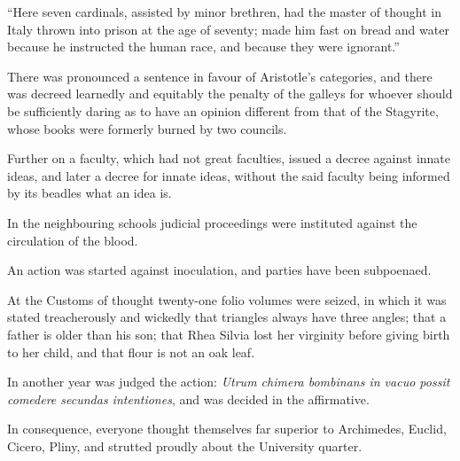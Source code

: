 \enquote{Here seven cardinals, assisted by minor brethren, had the master of
thought in Italy thrown into prison at the age of seventy; made him fast
on bread and water because he instructed the human race, and because
they were ignorant.}

There was pronounced a sentence in favour of Aristotle's categories, and
there was decreed learnedly and equitably the penalty of the galleys for
whoever should be sufficiently daring as to have an opinion different
from that of the Stagyrite, whose books were formerly burned by two
councils.

Further on a faculty, which had not great faculties, issued a decree
against innate ideas, and later a decree for innate ideas, without the
said faculty being informed by its beadles what an idea is.

In the neighbouring schools judicial proceedings were instituted against
the circulation of the blood.

An action was started against inoculation, and parties have been
subpoenaed.

At the Customs of thought twenty-one folio volumes were seized, in which
it was stated treacherously and wickedly that triangles always have
three angles; that a father is older than his son; that Rhea Silvia lost
her virginity before giving birth to her child, and that flour is not an
oak leaf.

In another year was judged the action: \textit{Utrum chimera bombinans in vacuo possit comedere secundas intentiones}, and was decided in the
affirmative.

In consequence, everyone thought themselves far superior to Archimedes,
Euclid, Cicero, Pliny, and strutted proudly about the University
quarter.



